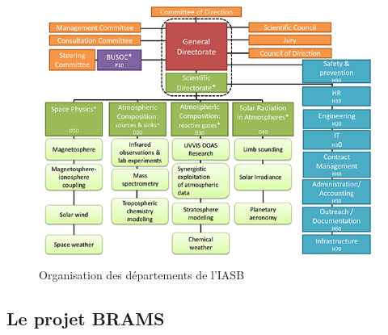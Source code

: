 \documentclass[11pt]{article}
\begin{document}
\begin{figure}[t]
    \begin{center}
        \includegraphics[scale=0.5]{organization.png}
        \caption{Organisation des départements de l'IASB}
    \end{center}
\end{figure}

\newpage

\subsection{Le projet BRAMS}
\end{document}
